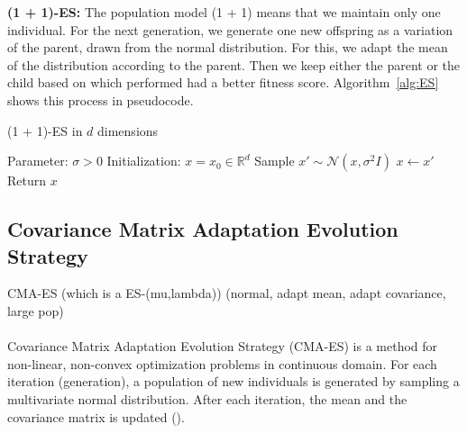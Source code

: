 \textbf{(1 + 1)-ES:} The population model (1 + 1) means that we maintain only one individual. For the next generation, we generate one new offspring as a variation of the parent, drawn from the normal distribution. For this, we adapt the mean of the distribution according to the parent. Then we keep either the parent or the child based on which performed had a better fitness score. Algorithm~\ref{alg:ES} shows this process in pseudocode.
\begin{algorithm}
\caption{(1 + 1)-ES in $d$ dimensions}
\begin{algorithmic}[1]
\State Parameter: $\sigma > 0$
\State Initialization: $x = x_0 \in \mathbb{R}^d$
    \State Sample $x' \sim \mathcal{N}(x, \sigma^2 I)$
      \State $x \leftarrow x'$
    \EndIf
\EndWhile
\State Return $x$
\end{algorithmic}
\label{alg:ES}
\end{algorithm}



\subsection{Covariance Matrix Adaptation Evolution Strategy}
CMA-ES (which is a ES-(mu,lambda)) (normal, adapt mean, adapt covariance, large pop) \\ \\
Covariance Matrix Adaptation Evolution Strategy (CMA-ES) is a method for non-linear, non-convex optimization problems in continuous domain. For each iteration (generation), a population of new individuals is generated by sampling a multivariate normal distribution. After each iteration, the mean and the covariance matrix is updated (\cite{hansen2016cma}).


